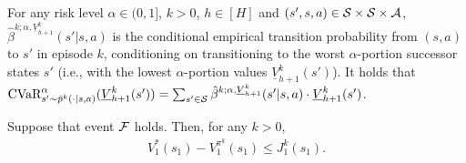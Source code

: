 For any risk level $\alpha \in (0,1]$, $k>0$, $h \in [H]$ and $(s',s,a) \in \mathcal{S} \times \mathcal{S} \times \mathcal{A}$, $\hat{\beta}^{k;\alpha,\underline{V}^k_{h+1}}(s'|s,a)$ is the conditional empirical transition  probability from $(s,a)$ to $s'$ in episode $k$, conditioning on transitioning to the worst $\alpha$-portion successor states $s'$ (i.e., with the lowest $\alpha$-portion values $\underline{V}^k_{h+1}(s')$). It holds that $\textup{CVaR}^{\alpha}_{s' \sim \hat{p}^k(\cdot|s,a)}(\underline{V}^k_{h+1}(s')) = \sum_{s' \in \mathcal{S}} \hat{\beta}^{k;\alpha,\underline{V}^k_{h+1}}(s'|s,a) \cdot \underline{V}^k_{h+1}(s')$.

\begin{lemma} \label{lemma:estimate_error}
	Suppose that event $\mathcal{F}$ holds. Then, for any $k>0$, 
	\begin{align*}
		V^{*}_1(s_1)-V^{\pi^k}_1(s_1) \leq J^k_1(s_1) .
	\end{align*}
\end{lemma}

